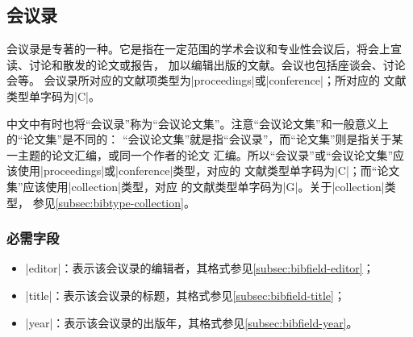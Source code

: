 
\subsection{会议录}\label{subsec:bibtype-conference}

会议录是专著的一种。它是指在一定范围的学术会议和专业性会议后，将会上宣读、讨论和散发的论文或报告，
加以编辑出版的文献\cite{hudong2013huiyilu}。会议也包括座谈会、讨论会等\cite{gbt7714-2005}。
会议录所对应的{\BibTeX}文献项类型为|proceedings|或|conference|；所对应的
文献类型单字码为|C|\cite{gbt7714-2005}。

\begin{note}
中文中有时也将“会议录”称为“会议论文集”。注意“会议论文集”和一般意义上的“论文集”是不同的：
“会议论文集”就是指“会议录”，而“论文集”则是指关于某一主题的论文汇编，或同一个作者的论文
汇编。所以“会议录”或“会议论文集”应该使用|proceedings|或|conference|类型，对应的
文献类型单字码为|C|；而“论文集”应该使用|collection|类型，对应
的文献类型单字码为|G|。关于|collection|类型，
参见\ref{subsec:bibtype-collection}。
\end{note}

\subsubsection{必需字段}

\begin{itemize}
\item |editor|：表示该会议录的编辑者，其格式参见\ref{subsec:bibfield-editor}；
\item |title|：表示该会议录的标题，其格式参见\ref{subsec:bibfield-title}；
\item |year|：表示该会议录的出版年，其格式参见\ref{subsec:bibfield-year}。
\end{itemize}

